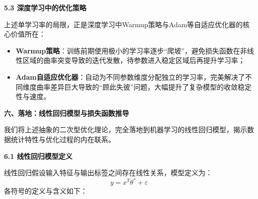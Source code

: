 \documentclass[10pt]{article}
\numberwithin{equation}{section}
\theoremstyle{plain}
\theoremstyle{definition}
\theoremstyle{remark}
\begin{document}
{\par\vspace{0.8ex}\noindent\normalsize\bfseries\color{secblue} 5.3 深度学习中的优化策略\par}
上述单学习率的局限，正是深度学习中Warmup策略与Adam等自适应优化器的核心价值所在：
\begin{itemize}[leftmargin=*,nosep]
    \item \textbf{Warmup策略}：训练前期使用极小的学习率逐步“爬坡”，避免损失函数在非线性区域的曲率突变导致的迭代发散，待参数进入稳定区域后再提升学习率；
    \item \textbf{Adam自适应优化器}：自动为不同参数维度分配独立的学习率，完美解决了不同维度曲率差异巨大导致的“顾此失彼”问题，大幅提升了复杂模型的收敛稳定性与速度。
\end{itemize}

{\par\vspace{1ex}\noindent\large\bfseries\color{brandD} 六、落地：线性回归模型与损失函数推导\par}\par\vspace{0.5ex}
我们将上述抽象的二次型优化理论，完全落地到机器学习的线性回归模型，揭示数据统计特性与优化过程的内在联系。

{\par\vspace{0.8ex}\noindent\normalsize\bfseries\color{secblue} 6.1 线性回归模型定义\par}
线性回归假设输入特征与输出标签之间存在线性关系，模型定义为：
\[ y = x^T \theta^* + \varepsilon \]
各符号的定义与含义如下：
\begin{center}
\renewcommand{\arraystretch}{1.3}
\end{center}
\end{document}
